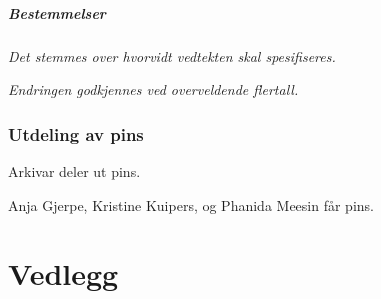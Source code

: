 \documentclass[10pt,norsk,a4paper]{article}
\begin{document}
\subsubsection{Bestemmelser}
\emph{Det stemmes over hvorvidt vedtekten skal spesifiseres.}

\textit{Endringen godkjennes ved overveldende flertall.}

\newpage

\section{Utdeling av pins}

Arkivar deler ut pins.

Anja Gjerpe, Kristine Kuipers, og Phanida Meesin får pins.


\part*{Vedlegg}\label{lastpage}

\newpage
{}

\end{document}
